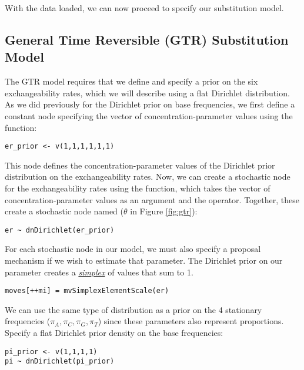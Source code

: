With the data loaded, we can now proceed to specify our substitution model.



\subsection{General Time Reversible (GTR) Substitution Model}

The GTR model requires that we define and specify a prior on the six exchangeability rates, which we will describe using a flat Dirichlet distribution.
As we did previously for the Dirichlet prior on base frequencies, we first define a constant node specifying the vector of concentration-parameter values using the  function:
{\tt \begin{snugshade*}
\begin{lstlisting}
er_prior <- v(1,1,1,1,1,1) 
\end{lstlisting}
\end{snugshade*}}
This node defines the concentration-parameter values of the Dirichlet prior distribution on the exchangeability rates. 
Now, we can create a stochastic node for the exchangeability rates using the  function, which takes the vector of concentration-parameter values as an argument and the \cl{\rbdn} operator. 
Together, these create a stochastic node named  ($\theta$ in Figure \ref{fig:gtr}): 
{\tt \begin{snugshade*}
\begin{lstlisting}
er ~ dnDirichlet(er_prior)
\end{lstlisting}
\end{snugshade*}}


For each stochastic node in our model, we must also specify a proposal mechanism if we wish to estimate that parameter. 
The Dirichlet prior on our parameter  creates a \href{http://en.wikipedia.org/wiki/Simplex}{\textit{simplex}} of values that sum to 1. 

{\tt\small \begin{snugshade*}
\begin{lstlisting}
moves[++mi] = mvSimplexElementScale(er) 
\end{lstlisting}
\end{snugshade*}}

We can use the same type of distribution as a prior on the 4 stationary frequencies ($\pi_A, \pi_C, \pi_G, \pi_T$) since these parameters also represent proportions. 
Specify a flat Dirichlet prior density on the base frequencies:
{\tt \begin{snugshade*}
\begin{lstlisting}
pi_prior <- v(1,1,1,1) 
pi ~ dnDirichlet(pi_prior)
\end{lstlisting}
\end{snugshade*}}

